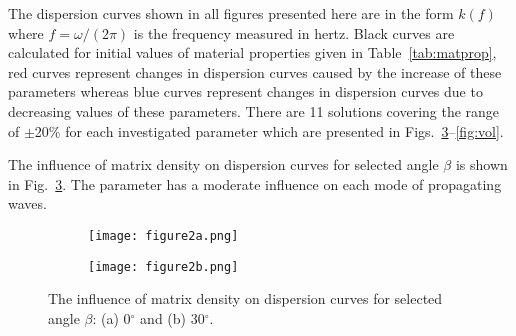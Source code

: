 \documentclass[preprint,12pt]{elsarticle}
\providecommand{\DIFaddbeginFL}{} %
\providecommand{\DIFaddendFL}{} %
\providecommand{\DIFdelbeginFL}{} %
\providecommand{\DIFdelendFL}{} %
\begin{document}
 The dispersion curves shown in all figures presented here are in the form $k(f)$ where $f=\omega/(2 \pi)$ is the frequency measured in hertz. Black curves are calculated for initial values of material properties given in Table~\ref{tab:matprop}, red curves represent changes in dispersion curves caused by the increase of these parameters whereas blue curves represent changes in dispersion curves due to decreasing values of these parameters. There are 11 solutions covering the range of $\pm$20\% for each investigated parameter which are presented in Figs.~\ref{fig:rhom}--\ref{fig:vol}.

 The influence of matrix density on dispersion curves for selected angle $\beta$ is shown in Fig.~\ref{fig:rhom}. The parameter has a moderate influence on each mode of propagating waves.

 \begin{figure} [h!]
 	\centering
 	\begin{subfigure}[b]{0.49\textwidth}
 		\centering
 		\DIFdelbeginFL %
\DIFdelendFL \DIFaddbeginFL \texttt{[image: figure2a.png]}
 		\DIFaddendFL \caption{}
 		\label{fig:rhom0}
 	\end{subfigure}
 	\hfill
 	\begin{subfigure}[b]{0.49\textwidth}
 		\centering
 		\DIFdelbeginFL %
\DIFdelendFL \DIFaddbeginFL \texttt{[image: figure2b.png]}
 		\DIFaddendFL \caption{}
 		\label{fig:rhom30}
 	\end{subfigure}
 	\caption{The influence of matrix density on dispersion curves for selected angle $\beta$: (a) 0$^{\circ}$ and (b) 30$^{\circ}$.} 
 	\label{fig:rhom}
 \end{figure}
\clearpage
\end{document}
